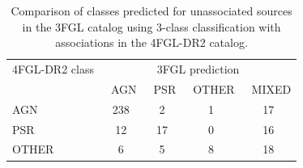 \begin{table}[!h]
\hspace{-0.2cm}
    \vspace{2mm}
    \caption{Testing accuracy of the four selected algorithms for the 3-class classification of 3FGL sources and comparison with associations in the 4FGL-DR2 catalog. 
    ``\_O'' denotes training with oversampling.}
    \label{tab:selected_algs_multi}
\end{table}


\begin{table}[!h]
 \renewcommand{\tabcolsep}{0.3mm}
\renewcommand{\arraystretch}{1.5}

    \begin{tabular}{l c c c c}
    \hline
    \hline
    4FGL-DR2 class & \multicolumn{4}{c}{3FGL prediction} \\
      &\ AGN &\ PSR &\ OTHER &\ MIXED \\
    \hline
    AGN & 238 & 2 &  1 & 17 \\ %
    PSR & 12 & 17 &  0 & 16 \\ %
    OTHER & 6 & 5 & 8 & 18 \\ %
    \hline
    \end{tabular}%
    \vspace{0.2cm}
    \caption{Comparison of classes predicted for unassociated sources in the 3FGL catalog using 3-class classification
    with associations in the 4FGL-DR2 catalog. 
}
    \label{tab:3FGL_vs_4FGL_2class}
\end{table}



